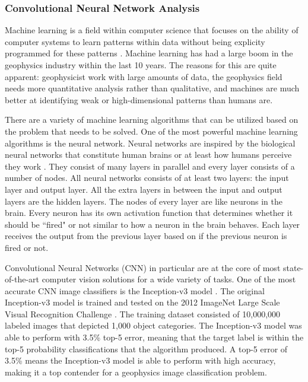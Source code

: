 \subsubsection{Convolutional Neural Network Analysis}
Machine learning is a field within computer science that focuses on the ability of computer systems to learn patterns within data without being explicity programmed for these patterns \citep{samuel1959some}. Machine learning has had a large boom in the geophysics industry within the last 10 years. The reasons for this are quite apparent: geophysicist work with large amounts of data, the geophysics field needs more quantitative analysis rather than qualitative, and machines are much better at identifying weak or high-dimensional patterns than humans are.

There are a variety of machine learning algorithms that can be utilized based on the problem that needs to be solved. One of the most powerful machine learning algorithms is the neural network. Neural networks are inspired by the biological neural networks that constitute human brains or at least how humans perceive they work \citep{Gerven2018}. They consist of many layers in parallel and every layer consists of a number of nodes. All neural networks consists of at least two layers: the input layer and output layer. All the extra layers in between the input and output layers are the hidden layers. The nodes of every layer are like neurons in the brain. Every neuron has its own activation function that determines whether it should be ``fired" or not similar to how a neuron in the brain behaves. Each layer receives the output from the previous layer based on if the previous neuron is fired or not.

Convolutional Neural Networks (CNN) in particular are at the core of most state-of-the-art computer vision solutions for a wide variety of tasks. One of the most accurate CNN image classifiers is the Inception-v3 model \citep{Szegedy2015}. The original Inception-v3 model is trained and tested on the 2012 ImageNet Large Scale Visual Recognition Challenge \citep{ILSVRC15}. The training dataset consisted of 10,000,000 labeled images that depicted 1,000 object categories. The Inception-v3 model was able to perform with 3.5\% top-5 error, meaning that the target label is within the top-5 probability classifications that the algorithm produced. A top-5 error of 3.5\% means the Inception-v3 model is able to perform with high accuracy, making it a top contender for a geophysics image classification problem.

